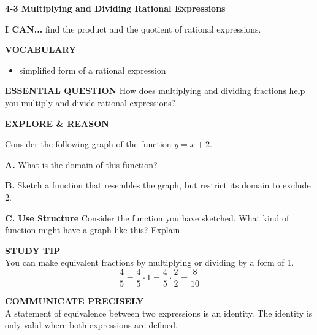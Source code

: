 \documentclass{article}
\newenvironment{lesson-meta}{}{}
\newenvironment{model-discuss}{}{}
\newenvironment{concept-box}{}{}
\begin{document}
\begin{lesson-meta}
\textbf{4-3 Multiplying and Dividing Rational Expressions}

\textbf{I CAN...} find the product and the quotient of rational expressions.

\textbf{VOCABULARY}
\begin{itemize}
    \item simplified form of a rational expression
\end{itemize}

\textbf{ESSENTIAL QUESTION}
How does multiplying and dividing fractions help you multiply and divide rational expressions?
\end{lesson-meta}

\begin{model-discuss}
\textbf{EXPLORE \& REASON}

Consider the following graph of the function $y = x + 2$.


\textbf{A.} What is the domain of this function?

\textbf{B.} Sketch a function that resembles the graph, but restrict its domain to exclude 2.

\textbf{C. Use Structure} Consider the function you have sketched. What kind of function might have a graph like this? Explain.
\end{model-discuss}

\begin{concept-box}
\textbf{STUDY TIP} \\
You can make equivalent fractions by multiplying or dividing by a form of 1.
$$ \frac{4}{5} = \frac{4}{5} \cdot 1 = \frac{4}{5} \cdot \frac{2}{2} = \frac{8}{10} $$
\end{concept-box}

\begin{concept-box}
\textbf{COMMUNICATE PRECISELY} \\
A statement of equivalence between two expressions is an identity. The identity is only valid where both expressions are defined.
\end{concept-box}
\end{document}
